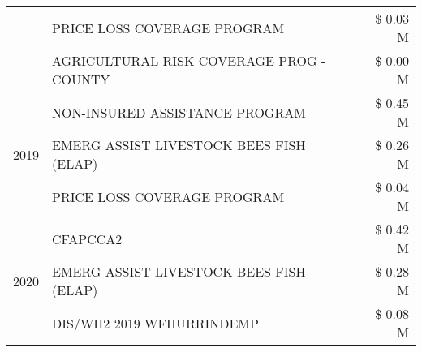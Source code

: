 \begin{tabular}{llr}
 & PRICE LOSS COVERAGE PROGRAM & \$ 0.03 M \\
 & AGRICULTURAL RISK COVERAGE PROG - COUNTY & \$ 0.00 M \\
\cline{1-3}
\multirow[t]{3}{*}{2019} & NON-INSURED ASSISTANCE PROGRAM & \$ 0.45 M \\
 & EMERG ASSIST LIVESTOCK BEES FISH (ELAP) & \$ 0.26 M \\
 & PRICE LOSS COVERAGE PROGRAM & \$ 0.04 M \\
\cline{1-3}
\multirow[t]{3}{*}{2020} & CFAPCCA2 & \$ 0.42 M \\
 & EMERG ASSIST LIVESTOCK BEES FISH (ELAP) & \$ 0.28 M \\
 & DIS/WH2 2019 WFHURRINDEMP & \$ 0.08 M \\
\cline{1-3}
\bottomrule
\end{tabular}
